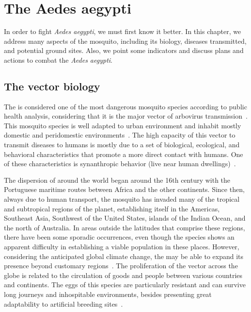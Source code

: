 \chapter{The \textbf{Aedes aegypti}}
\label{chap:mosquito}
%
In order to fight \textit{Aedes aegypti}, we must first know it better.
In this chapter, we address many aspects of the mosquito, including its
biology, diseases transmitted, and potential ground sites.
Also, we point some indicators and discuss plans and actions to combat the \textit{Aedes aegypti}.


\section{The vector biology}\label{sec:bio}
%
The \Aedes is considered one of the most dangerous mosquito species according to public health analysis, considering that it is the major vector of arbovirus transmission~\cite{ruckert2017}.
This mosquito species is well adapted to urban environment and inhabit mostly domestic and peridomestic environments~\cite{Jansen2010}.
The high capacity of this vector to transmit diseases to humans is mostly due to a set of biological, ecological, and behavioral characteristics that promote a more direct contact with humans.
One of these characteristics is synanthropic behavior (live near human dwellings)~\cite{Jansen2010}.

The dispersion of \Aedes around the world began around the 16th century with the Portuguese maritime routes between Africa and the other continents.
Since then, always due to human transport, the mosquito has invaded many of the tropical and subtropical regions of the planet, establishing itself in the Americas, Southeast Asia, Southwest of the United States, islands of the Indian Ocean, and the north of Australia.
In areas outside the latitudes that comprise these regions, there have been some sporadic occurrences, even though the species shows an apparent difficulty in establishing a viable population in these places. However, considering the anticipated global climate change, the \Aedes may be able to expand its presence beyond customary regions~\cite{liu2016climate}.
The proliferation of the vector across the globe is related to the circulation of goods and people between various countries and continents.
The eggs of this species are particularly resistant and can survive long journeys and inhospitable environments, besides presenting great adaptability to artificial breeding sites~\cite{liu2016climate}.

